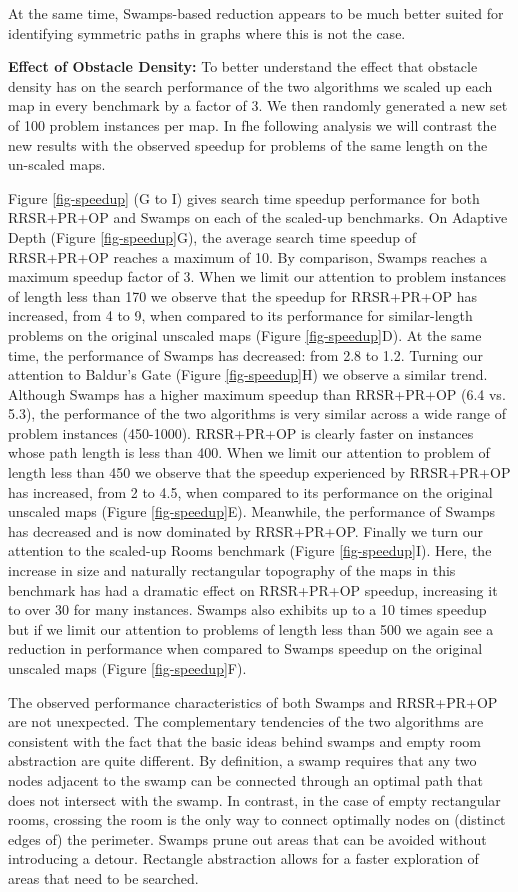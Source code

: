 At the same time, Swamps-based reduction appears to be much better suited for identifying symmetric paths 
in graphs where this is not the case.
\par
\textbf{Effect of Obstacle Density:}
To better understand the effect that obstacle density has on the search performance of the two algorithms
we scaled up each map in every benchmark by a factor of 3.
We then randomly generated a new set of 100 problem instances per map.
In fhe following analysis we will contrast the new
results with the observed speedup for problems of the same length on the un-scaled maps.
\par
Figure \ref{fig-speedup} (G to I) gives search time speedup performance for both RRSR+PR+OP and Swamps
on each of the scaled-up benchmarks.
On Adaptive Depth (Figure \ref{fig-speedup}G), the average search time speedup of RRSR+PR+OP reaches a maximum of 10. 
By comparison, Swamps reaches a maximum speedup factor of 3.
When we limit our attention to problem instances of length less than 170 we observe that the speedup 
for RRSR+PR+OP has increased, from 4 to 9, when compared to its performance for similar-length problems on the original 
unscaled maps (Figure \ref{fig-speedup}D). 
At the same time, the performance of Swamps has decreased: from 2.8 to 1.2.
Turning our attention to Baldur's Gate (Figure \ref{fig-speedup}H) we observe a similar trend.
Although Swamps has a higher maximum speedup than RRSR+PR+OP (6.4 vs. 5.3), the performance of the two 
algorithms is very similar across a wide range of problem instances (450-1000).
RRSR+PR+OP is clearly faster on instances whose path length is less than 400.
When we limit our attention to problem of length less than 450 we observe that the speedup experienced by
RRSR+PR+OP has increased, from 2 to 4.5, when compared to its performance on the original unscaled maps
(Figure \ref{fig-speedup}E).
Meanwhile, the performance of Swamps has decreased and is now dominated by RRSR+PR+OP.
Finally we turn our attention to the scaled-up Rooms benchmark (Figure \ref{fig-speedup}I).
Here, the increase in size and naturally rectangular topography of the maps in this benchmark
has had a dramatic effect on RRSR+PR+OP speedup, increasing it to over 30 for many instances.
Swamps also exhibits up to a 10 times speedup but if we limit our attention to problems of
length less than 500 we again see a reduction in performance when compared to Swamps speedup
on the original unscaled maps (Figure \ref{fig-speedup}F). 
\par
The observed performance characteristics of both Swamps and RRSR+PR+OP
are not unexpected.
The complementary tendencies of the two algorithms
are consistent with the fact that 
the basic ideas behind swamps and empty room abstraction are quite different.
By definition, a swamp requires that any two nodes adjacent to the swamp
can be connected through an optimal path that does not intersect with the swamp.
In contrast, in the case of empty rectangular rooms, 
crossing the room is the only way to connect optimally nodes on (distinct edges of) the perimeter.
Swamps prune out areas that can be avoided without introducing a detour.
Rectangle abstraction allows for a faster exploration of areas that need to be searched.


